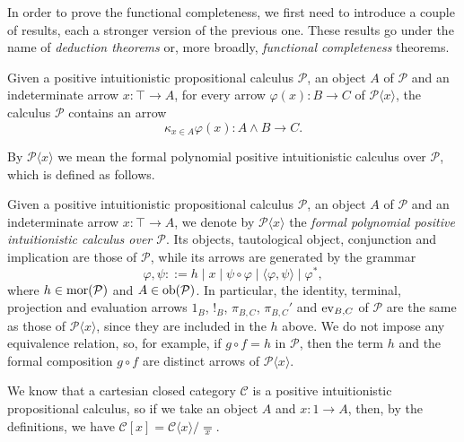 In order to prove the functional completeness, we first need to introduce a couple of results, each a stronger version of the previous one. These results go under the name of \emph{deduction theorems} or, more broadly, \emph{functional completeness} theorems.

\begin{theorem}
    Given a positive intuitionistic propositional calculus $\mathcal P$, an object $A$ of $\mathcal P$ and an indeterminate arrow $x : \top \to A$,
    for every arrow $\varphi(x) : B \to C$ of $\mathcal P\langle x\rangle$, the calculus $\mathcal P$ contains an arrow
    \[ \kappa_{x \in A}\varphi(x) : A \land B \to C. \]
\end{theorem}

By $\mathcal P\langle x\rangle$ we mean the formal polynomial positive intuitionistic calculus over $\mathcal P$, which is defined as follows.

\begin{definition}
    Given a positive intuitionistic propositional calculus $\mathcal P$, an object $A$ of $\mathcal P$ and an indeterminate arrow $x : \top \to A$, we denote by
    $\mathcal P\langle x\rangle$ the \emph{formal polynomial positive intuitionistic calculus over $\mathcal P$}. Its objects, tautological object, conjunction and implication are those of
    $\mathcal P$, while its arrows are generated by the grammar
    \[ \varphi,\psi ::= h \mid x \mid \psi \circ \varphi \mid \langle \varphi,\psi\rangle \mid \varphi^*, \]
    where $h \in \operatorname{mor}(\mathcal P)$ and $A \in \operatorname{ob}(\mathcal P)$. In particular, the identity, terminal, projection and evaluation arrows $1_B$, $!_B$, $\pi_{B,C}$, $\pi_{B,C}'$ and $\operatorname{ev}_{B,C}$ of $\mathcal P$ are the same as those of $\mathcal P\langle x \rangle$, since they are included in the $h$ above.
    We do not impose any equivalence relation, so, for example, if $g \circ f = h$ in $\mathcal P$, then the term $h$ and the formal composition $g \circ f$ are distinct arrows of $\mathcal P\langle x\rangle$.
\end{definition}

\begin{example}
    We know that a cartesian closed category $\mathcal C$ is a positive intuitionistic propositional calculus, so if we take an object $A$ and $x : 1 \to A$, then,
    by the definitions, we have $\mathcal C[x] = \mathcal C\langle x\rangle / \underset{x}{=}$.
\end{example}

